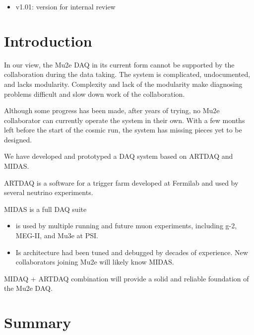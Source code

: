 \documentclass[12pt]{article}
\begin{document}
\begin{itemize}
\item
  v1.01: version for internal review
\end{itemize}

% 
\newpage
\section {Introduction}
In our view, the Mu2e DAQ in its current form cannot be supported 
by the collaboration during the data taking.
The system is complicated, undocumented, and lacks modularity.
Complexity and lack of the modularity make diagnosing problems
difficult and slow down work of the collaboration.

Although some progress has been made, after years of trying,
no Mu2e collaborator can currently operate the system in their own. 
With a few months left before the start of the cosmic run,
the system has missing pieces yet to be designed. 

We have developed and prototyped a DAQ system based on ARTDAQ and MIDAS.

ARTDAQ is a software for a trigger farm developed at Fermilab and used
by several neutrino experiments. 

MIDAS is a full DAQ suite
\begin{itemize}
\item 
  is used by multiple running and future muon experiments, 
  including g-2, MEG-II, and Mu3e at PSI.
\item
  Is architecture had been tuned and debugged by decades of experience.
  New collaborators joining Mu2e will likely know MIDAS.
\end{itemize}

MIDAQ + ARTDAQ combination will provide a solid and reliable foundation
of the Mu2e DAQ.








\section {Summary}



%
\newpage



% 

\end{document}
